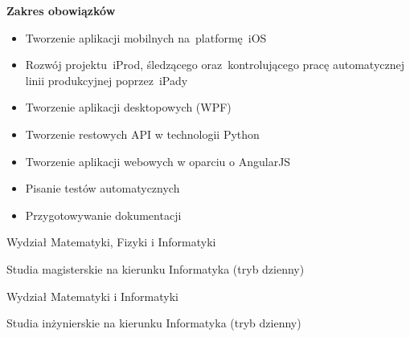 \documentclass[11pt,a4paper]{article}
\begin{document}
    \medskip
    \vspace{-1.6mm}
    \begin{description} \itemsep0pt \parskip0pt 
        \item[ ] {\bf Zakres obowiązków}
        \begin{itemize} \itemsep2pt \parskip0pt 
            \item Tworzenie aplikacji mobilnych na~platformę~iOS
            \item Rozwój projektu~iProd, śledzącego oraz~kontrolującego pracę automatycznej linii produkcyjnej poprzez~iPady
            \item Tworzenie aplikacji desktopowych (WPF)
            \item Tworzenie restowych API w technologii Python
            \item Tworzenie aplikacji webowych w oparciu o AngularJS
            \item Pisanie testów automatycznych
            \item Przygotowywanie dokumentacji
        \end{itemize}
    \end{description}

  
    \vspace{0.3cm}
  
    \medskip
    \vspace{-1.6mm}
    \begin{description} \itemsep0pt \parskip0pt 
        \item[ ] Wydział Matematyki, Fizyki i Informatyki
        \item[ ] Studia magisterskie na kierunku Informatyka (tryb dzienny)
    \end{description}
  
    \vspace{-1.6mm}
    \begin{description} \itemsep0pt \parskip0pt 
        \item[ ] Wydział Matematyki i Informatyki
        \item[ ] Studia inżynierskie na kierunku Informatyka (tryb dzienny)
    \end{description}
  
\end{document}
